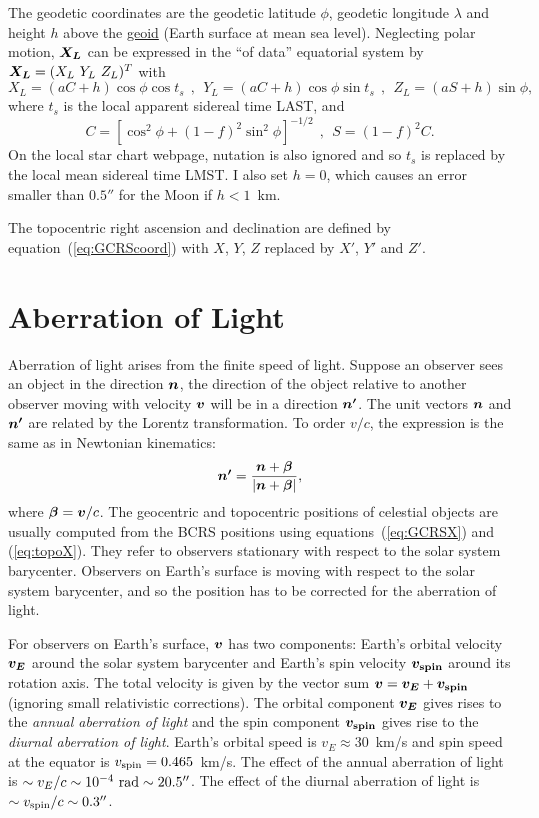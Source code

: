 \documentclass[12pt]{article}
\newcommand \beq {\begin{equation}}
\newcommand \eeq {\end{equation}}
\newcommand{\ve}[1]{\mbox{\boldmath $#1$}}
\begin{document}
The geodetic coordinates are the geodetic latitude $\phi$, geodetic longitude $\lambda$ and 
height $h$ above the \href{https://en.wikipedia.org/wiki/Geoid}{geoid} 
(Earth surface at mean sea level). Neglecting polar motion, $\ve{X_L}$ can be 
expressed in the ``of data'' equatorial system by $\ve{X_L}=(X_L\ Y_L\ Z_L)^T$ with 
\beq
 X_L = (aC + h)\cos \phi \cos t_s \ \ , \ \ 
 Y_L = (aC + h)\cos \phi \sin t_s \ \ , \ \ 
 Z_L = (aS + h) \sin \phi , 
\label{eq:XL}
\eeq
where $t_s$ is the local apparent sidereal time LAST, and 
\beq
  C = [\cos^2 \phi + (1-f)^2 \sin^2 \phi]^{-1/2} \ \ , \ \ 
  S = (1-f)^2 C .
\label{eq:topoCS}
\eeq
On the local star chart webpage, nutation is also ignored and so $t_s$ 
is replaced by the local mean sidereal time LMST. I also set $h=0$, which 
causes an error smaller than $0.5''$ for the Moon if $h<1$~km. 

The topocentric right ascension and declination are defined by 
equation~(\ref{eq:GCRScoord}) with $X$, $Y$, $Z$ replaced by $X'$, $Y'$ and 
$Z'$.

\section{Aberration of Light} 

Aberration of light arises from the finite speed of light. Suppose an observer 
sees an object in the direction $\ve{n}$, the direction of the object 
relative to another observer moving with velocity $\ve{v}$ will be in 
a direction $\ve{n'}$. The unit vectors $\ve{n}$ and $\ve{n'}$ are related 
by the Lorentz transformation. To order $v/c$, the expression is the same as 
in Newtonian kinematics:
\beq
  \ve{n'} = \frac{\ve{n} + \ve{\beta}}{|\ve{n} + \ve{\beta}|} ,
\label{eq:aberration}
\eeq
where $\ve{\beta} = \ve{v}/c$. The geocentric and topocentric positions 
of celestial objects are usually computed from the BCRS positions 
using equations~(\ref{eq:GCRSX}) and (\ref{eq:topoX}). They refer 
to observers stationary with respect to the solar system barycenter. 
Observers on Earth's surface is moving with respect to the solar system barycenter, 
and so the position has to be corrected for the aberration of light. 

For observers on Earth's surface, $\ve{v}$ has two components: Earth's 
orbital velocity $\ve{v_E}$ around the solar system barycenter 
and Earth's spin velocity $\ve{v_{\rm spin}}$ around its rotation axis. 
The total velocity is given by the vector sum 
$\ve{v}=\ve{v_E} + \ve{v_{\rm spin}}$ (ignoring small relativistic 
corrections). The orbital component $\ve{v_E}$ gives rises to the 
{\em annual aberration of light} and the spin component $\ve{v_{\rm spin}}$ 
gives rise to the {\em diurnal aberration of light}. Earth's orbital 
speed is $v_E \approx 30$~km/s and spin speed at the equator is 
$v_{\rm spin}=0.465$~km/s. The effect of the annual aberration of light is 
$\sim v_E/c \sim 10^{-4}~{\rm rad}\sim 20.5''$. The effect of the 
diurnal aberration of light is $\sim v_{\rm spin}/c \sim 0.3''$.
\end{document}
